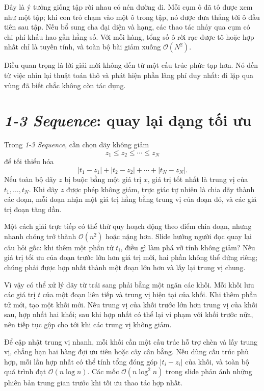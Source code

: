 \documentclass[11pt]{article}
\newcommand{\Oh}{\mathcal{O}}
\begin{document}
Đây là ý tưởng giống tập rời nhau có nén đường đi. Mỗi cụm ô đã tô được xem
như một tập; khi con trỏ chạm vào một ô trong tập, nó được đưa thẳng tới ô đầu
tiên sau tập. Nếu bổ sung cha đại diện và hạng, các thao tác nhảy qua cụm có
chi phí khấu hao gần hằng số. Với mỗi hàng, tổng số ô rời rạc được tô hoặc
hợp nhất chỉ là tuyến tính, và toàn bộ bài giảm xuống \(\Oh(N^2)\).

Điều quan trọng là lời giải mới không đến từ một cấu trúc phức tạp hơn. Nó
đến từ việc nhìn lại thuật toán thô và phát hiện phần lãng phí duy nhất:
đi lặp qua vùng đã biết chắc không còn tác dụng.

\section{\textit{1-3 Sequence}: quay lại dạng tối ưu}

Trong \textit{1-3 Sequence}, cần chọn dãy không giảm
\[
  z_1\le z_2\le \cdots \le z_N
\]
để tối thiểu hóa
\[
  |t_1-z_1|+|t_2-z_2|+\cdots+|t_N-z_N|.
\]
Nếu toàn bộ dãy \(z\) bị buộc bằng một giá trị \(x\), giá trị tốt nhất là
trung vị của \(t_1,\ldots,t_N\). Khi dãy \(z\) được phép không giảm, trực giác
tự nhiên là chia dãy thành các đoạn, mỗi đoạn nhận một giá trị hằng bằng trung
vị của đoạn đó, và các giá trị đoạn tăng dần.

Một cách giải trực tiếp có thể thử quy hoạch động theo điểm chia đoạn, nhưng
nhanh chóng trở thành \(\Oh(n^2)\) hoặc nặng hơn. Slide hướng người đọc quay
lại câu hỏi gốc: khi thêm một phần tử \(t_i\), điều gì làm phá vỡ tính không
giảm? Nếu giá trị tối ưu của đoạn trước lớn hơn giá trị mới, hai phần không
thể đứng riêng; chúng phải được hợp nhất thành một đoạn lớn hơn và lấy lại
trung vị chung.

Vì vậy có thể xử lý dãy từ trái sang phải bằng một ngăn các khối. Mỗi khối
lưu các giá trị \(t\) của một đoạn liên tiếp và trung vị hiện tại của khối.
Khi thêm phần tử mới, tạo một khối mới. Nếu trung vị của khối trước lớn hơn
trung vị của khối sau, hợp nhất hai khối; sau khi hợp nhất có thể lại vi phạm
với khối trước nữa, nên tiếp tục gộp cho tới khi các trung vị không giảm.

Để cập nhật trung vị nhanh, mỗi khối cần một cấu trúc hỗ trợ chèn và lấy trung
vị, chẳng hạn hai hàng đợi ưu tiên hoặc cây cân bằng. Nếu dùng cấu trúc phù
hợp, mỗi lần hợp nhất có thể tính tổng đóng góp \(|t_i-z_i|\) của khối, và
toàn bộ quá trình đạt \(\Oh(n\log n)\). Các mốc \(\Oh(n\log^2 n)\) trong
slide phản ánh những phiên bản trung gian trước khi tối ưu thao tác hợp nhất.
\end{document}
